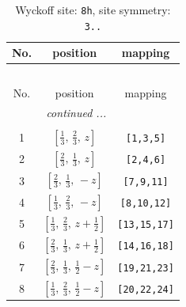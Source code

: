 \documentclass[fleqn,8pt]{jsarticle}
\begin{document}
\begin{longtable}{ccc}
\caption{Wyckoff site: {\tt 8h}, site symmetry: {\tt 3..}}
 \\
 \hline \hline
No. & position & mapping \\ \hline \endfirsthead

\multicolumn{2}{l}{\tablename\ \thetable{}} \\
 \hline \hline
No. & position & mapping \\ \hline \endhead

 \hline \hline
\multicolumn{2}{r}{\footnotesize\it continued ...} \\ \endfoot

 \hline \hline
\multicolumn{2}{r}{} \\ \endlastfoot

1 & $\left[ \frac{1}{3},\, \frac{2}{3},\, z \right]$ & {\tt [1,3,5]} \\ \hline
2 & $\left[ \frac{2}{3},\, \frac{1}{3},\, z \right]$ & {\tt [2,4,6]} \\ \hline
3 & $\left[ \frac{2}{3},\, \frac{1}{3},\, - z \right]$ & {\tt [7,9,11]} \\ \hline
4 & $\left[ \frac{1}{3},\, \frac{2}{3},\, - z \right]$ & {\tt [8,10,12]} \\ \hline
5 & $\left[ \frac{1}{3},\, \frac{2}{3},\, z + \frac{1}{2} \right]$ & {\tt [13,15,17]} \\ \hline
6 & $\left[ \frac{2}{3},\, \frac{1}{3},\, z + \frac{1}{2} \right]$ & {\tt [14,16,18]} \\ \hline
7 & $\left[ \frac{2}{3},\, \frac{1}{3},\, \frac{1}{2} - z \right]$ & {\tt [19,21,23]} \\ \hline
8 & $\left[ \frac{1}{3},\, \frac{2}{3},\, \frac{1}{2} - z \right]$ & {\tt [20,22,24]} \\
\end{longtable}
\renewcommand{\arraystretch}{1.2}
\end{document}
